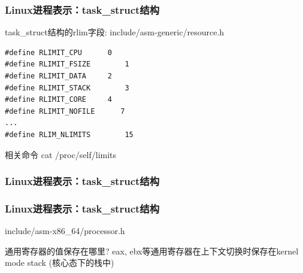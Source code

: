 \documentclass[xcolor=svgnames]{beamer}
\begin{document}
\begin{CJK*}{UTF8}{gbsn}
\begin{frame}[fragile]
\frametitle{Linux进程表示：task\_struct结构}
\begin{block}{task\_struct结构的rlim字段: include/asm-generic/resource.h}
\begin{verbatim}
#define RLIMIT_CPU      0   
#define RLIMIT_FSIZE        1  
#define RLIMIT_DATA     2   
#define RLIMIT_STACK        3 
#define RLIMIT_CORE     4   
#define RLIMIT_NOFILE      7  
...
#define RLIM_NLIMITS        15
\end{verbatim}
\end{block}
\begin{block}{相关命令}
cat /proc/self/limits
\end{block}
\end{frame}

\begin{frame}[fragile]
\frametitle{Linux进程表示：task\_struct结构}
\lstthreadintask
\end{frame}

\begin{frame}[fragile]
\frametitle{Linux进程表示：task\_struct结构}
\begin{block}{include/asm-x86\_64/processor.h}
\lstthreadstruct
\end{block}
\begin{block}{通用寄存器的值保存在哪里?}
\alert{eax}, \alert{ebx}等通用寄存器在上下文切换时保存在kernel mode stack (核心态下的栈中)
\end{block}
\end{frame}


\end{CJK*}
\end{document}

